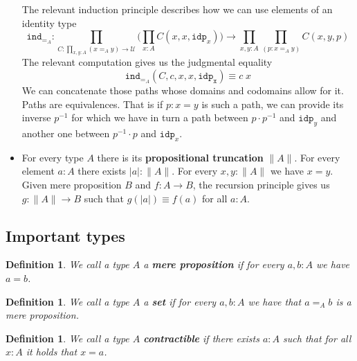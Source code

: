 \documentclass[12pt]{article}
\newtheorem{defn}[thm]{Definition}
\begin{document}
\begin{itemize}
	The relevant induction principle describes how we can use elements of an identity type
	$$\mathtt{ind}_{=_{A}} : \prod_{C : \prod_{x,y : A} (x =_A y) \rightarrow \mathcal{U}} \Big( \prod_{x : A}C(x,x,\mathtt{idp}_x) \Big) \rightarrow \prod_{x,y : A} \prod_{(p : x =_A y)} C(x,y,p)$$
	The relevant computation gives us the judgmental equality 
	$$\mathtt{ind}_{=_A} (C,c,x,x,\mathtt{idp_x}) \equiv c\; x$$
	We can concatenate those paths whose domains and codomains allow for it. 
	Paths are equivalences. That is if $p : x = y$ is such a  path, we can provide its inverse $p^{-1}$ for which we have in turn a path between $p\cdot p^{-1}$ and $\mathtt{idp}_y$ and another one between $p^{-1}\cdot p$ and $\mathtt{idp}_x$. 
	\item For every type $A$ there is its \textbf{propositional truncation} $\| A \|$. 
	For every element $a : A$ there exists $|a| : \| A\|$. 
	For every $x, y : \| A\|$ we have $x = y$. 
	Given mere proposition $B$ and $f : A \rightarrow B$, the recursion principle gives us $g : \|A\| \rightarrow B$ such that $g(|a|) \equiv f(a)$ for all $a : A$.


\end{itemize}

\subsection{Important types}
\begin{defn}
We call a type $A$ a \textbf{mere proposition} if for every $a,b : A$ we have $a = b$.
\end{defn}

\begin{defn}
We call a type $A$ a \textbf{set} if for every $a,b : A$ we have that $a =_A b$ is a mere proposition.
\end{defn}

\begin{defn}
We call a type $A$ \textbf{contractible} if there exists $a : A$ such that for all $x : A$ it holds that $x = a$.
\end{defn}
\end{document}
